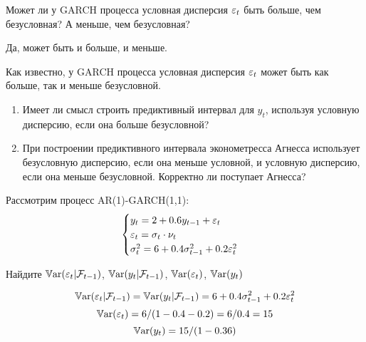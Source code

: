 \begin{problem}
Может ли у GARCH процесса условная дисперсия $\varepsilon_t$ быть больше, чем безусловная? А меньше, чем безусловная?
\begin{sol}
Да, может быть и больше, и меньше.
\end{sol}
\end{problem}

\begin{problem}
Как известно, у GARCH процесса условная дисперсия $\varepsilon_t$ может быть как больше, так и меньше безусловной.
\begin{enumerate}
\item Имеет ли смысл строить предиктивный интервал для $y_t$, используя условную дисперсию, если она больше безусловной?
\item При построении предиктивного интервала эконометресса Агнесса использует безусловную дисперсию, если она меньше условной, и условную дисперсию, если она меньше безусловной. Корректно ли поступает Агнесса?
\end{enumerate}
\begin{sol}

\end{sol}
\end{problem}



\begin{problem}
Рассмотрим процесс AR(1)-GARCH(1,1):
\[
\begin{cases}
y_t = 2 + 0.6 y_{t-1} + \varepsilon_t \\
\varepsilon_t = \sigma_t \cdot \nu_t \\
\sigma^2_t = 6 + 0.4 \sigma^2_{t-1} + 0.2\varepsilon_t^2
\end{cases}
\]


Найдите $\operatorname{\mathbb{V}\mathrm{ar}}(\varepsilon_t | \mathcal{F}_{t-1})$, $\operatorname{\mathbb{V}\mathrm{ar}}(y_t| \mathcal{F}_{t-1})$, $\operatorname{\mathbb{V}\mathrm{ar}}(\varepsilon_t)$, $\operatorname{\mathbb{V}\mathrm{ar}}(y_t)$


\begin{sol}
\[
\operatorname{\mathbb{V}\mathrm{ar}}(\varepsilon_t | \mathcal{F}_{t-1}) = \operatorname{\mathbb{V}\mathrm{ar}}(y_t| \mathcal{F}_{t-1}) = 6 + 0.4 \sigma^2_{t-1} + 0.2\varepsilon_t^2
\]
\[
\operatorname{\mathbb{V}\mathrm{ar}}(\varepsilon_t) = 6/(1-0.4-0.2)=6/0.4=15
\]
\[
\operatorname{\mathbb{V}\mathrm{ar}}(y_t)=15/(1-0.36)
\]
\end{sol}
\end{problem}


